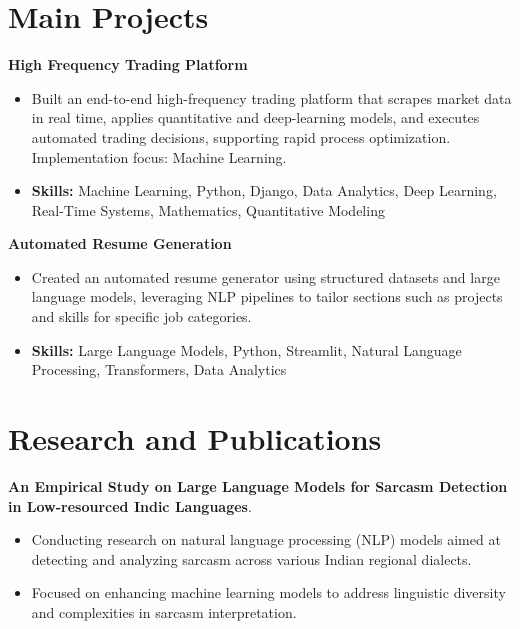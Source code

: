 \documentclass[a4paper,11pt]{article}
\begin{document}
\section{\textbf{Main Projects}}

\vspace{1mm}
  \textbf{High Frequency Trading Platform  }
\vspace{-1.5mm} %
\begin{itemize}
  \item Built an end-to-end high-frequency trading platform that scrapes market data in real time, applies quantitative and deep-learning models, and executes automated trading decisions, supporting rapid process optimization. Implementation focus: Machine Learning.
\vspace{-3mm}
  \item \textbf{Skills:} Machine Learning, Python, Django, Data Analytics, Deep Learning, Real-Time Systems, Mathematics, Quantitative Modeling
\end{itemize}


\vspace{1mm}
   \textbf{Automated Resume Generation }
\vspace{-1.5mm} %
\begin{itemize}
  \item Created an automated resume generator using structured datasets and large language models, leveraging NLP pipelines to tailor sections such as projects and skills for specific job categories.
\vspace{-3mm}
  \item \textbf{Skills:} Large Language Models, Python, Streamlit, Natural Language Processing, Transformers, Data Analytics
\end{itemize}



\section{\textbf{Research and Publications} \hfill }
\vspace{1mm}
  \textbf{An Empirical Study on Large Language Models for Sarcasm Detection in Low-resourced Indic Languages}.
\vspace{-1mm} %
\begin{itemize}
  \item Conducting research on natural language processing (NLP) models aimed at detecting and analyzing sarcasm across various Indian regional dialects.
\vspace{-3mm}
  \item Focused on enhancing machine learning models to address linguistic diversity and complexities in sarcasm interpretation.
\end{itemize}
\end{document}
